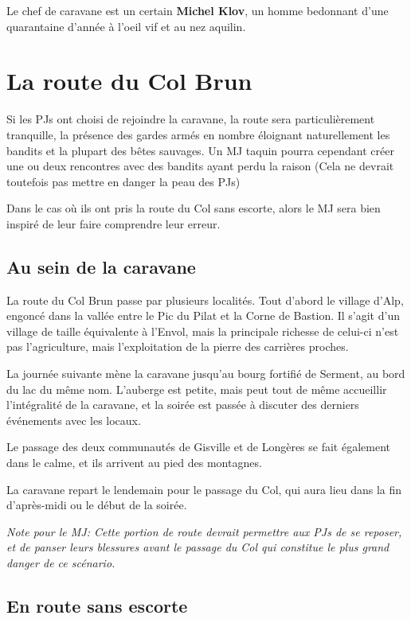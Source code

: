 \documentclass[10pt,twoside,twocolumn,openany,bg=print,justified]{dndbook}
\begin{document}
Le chef de caravane est un certain \textbf{Michel Klov}, un homme bedonnant d'une quarantaine d'année à l'oeil vif et au nez aquilin.

\section{La route du Col Brun}

Si les PJs ont choisi de rejoindre la caravane, la route sera particulièrement tranquille, la présence des gardes armés en nombre éloignant naturellement les bandits et la plupart des bêtes sauvages. Un MJ taquin pourra cependant créer une ou deux rencontres avec des bandits ayant perdu la raison (Cela ne devrait toutefois pas mettre en danger la peau des PJs)

Dans le cas où ils ont pris la route du Col sans escorte, alors le MJ sera bien inspiré de leur faire comprendre leur erreur.

\subsection*{Au sein de la caravane}

La route du Col Brun passe par plusieurs localités. Tout d'abord le village d'Alp, engoncé dans la vallée entre le Pic du Pilat et la Corne de Bastion. Il s'agit d'un village de taille équivalente à l'Envol, mais la principale richesse de celui-ci n'est pas l'agriculture, mais l'exploitation de la pierre des carrières proches.

La journée suivante mène la caravane jusqu'au bourg fortifié de Serment, au bord du lac du même nom. L'auberge est petite, mais peut tout de même accueillir l'intégralité de la caravane, et la soirée est passée à discuter des derniers événements avec les locaux.

Le passage des deux communautés de Gisville et de Longères se fait également dans le calme, et ils arrivent au pied des montagnes.

La caravane repart le lendemain pour le passage du Col, qui aura lieu dans la fin d'après-midi ou le début de la soirée.

\textit{Note pour le MJ: Cette portion de route devrait permettre aux PJs de se reposer, et de panser leurs blessures avant le passage du Col qui constitue le plus grand danger de ce scénario.}

\subsection*{En route sans escorte}
\end{document}
